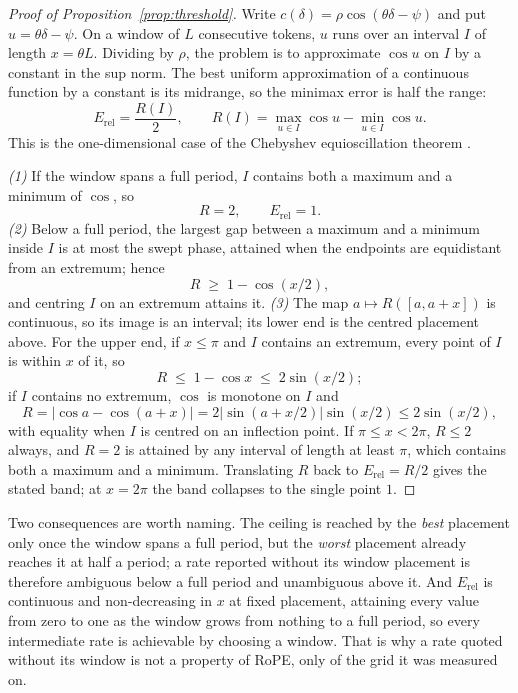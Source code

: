 \documentclass{article}
\theoremstyle{plain}
\theoremstyle{remark}
\begin{document}
\begin{proof}[Proof of Proposition~\ref{prop:threshold}]
Write $c(\delta)=\rho\cos(\theta\delta-\psi)$ and put $u=\theta\delta-\psi$. On
a window of $L$ consecutive tokens, $u$ runs over an interval $I$ of length
$x=\theta L$. Dividing by $\rho$, the problem is to approximate $\cos u$ on $I$
by a constant in the sup norm. The best uniform approximation of a continuous
function by a constant is its midrange, so the minimax error is half the range:
\begin{equation}
  E_{\mathrm{rel}} = \frac{R(I)}{2}, \qquad
  R(I) = \max_{u\in I}\cos u - \min_{u\in I}\cos u .
\end{equation}
This is the one-dimensional case of the Chebyshev equioscillation theorem
\citep{powell1981approximation}.

\emph{(1)} If the window spans a full period, $I$ contains both a maximum and a
minimum of $\cos$, so
\begin{equation}
  R = 2, \qquad E_{\mathrm{rel}} = 1 .
\end{equation}
\emph{(2)} Below a full period, the largest gap between a maximum and a minimum
inside $I$ is at most the swept phase, attained when the endpoints are
equidistant from an extremum; hence
\begin{equation}
  R \;\ge\; 1-\cos(x/2),
\end{equation}
and centring $I$ on an extremum attains it. \emph{(3)} The map
$a\mapsto R([a,a+x])$ is continuous, so its image is an interval; its lower end
is the centred placement above. For the upper end, if $x\le\pi$ and $I$ contains
an extremum, every point of $I$ is within $x$ of it, so
\begin{equation}
  R \;\le\; 1-\cos x \;\le\; 2\sin(x/2);
\end{equation}
if $I$ contains no extremum, $\cos$ is monotone on $I$ and
\begin{equation}
  R = |\cos a-\cos(a+x)| = 2|\sin(a+x/2)|\sin(x/2) \le 2\sin(x/2),
\end{equation}
with equality when $I$ is centred on an inflection point. If $\pi\le x<2\pi$,
$R\le2$ always, and $R=2$ is attained by any interval of length at least $\pi$,
which contains both a maximum and a minimum. Translating $R$ back to
$E_{\mathrm{rel}}=R/2$ gives the stated band; at $x=2\pi$ the band collapses to
the single point $1$.
\end{proof}

Two consequences are worth naming. The ceiling is reached by the \emph{best}
placement only once the window spans a full period, but the \emph{worst}
placement already reaches it at half a period; a rate reported without its window
placement is therefore ambiguous below a full period and unambiguous above it.
And $E_{\mathrm{rel}}$ is continuous and non-decreasing in $x$ at fixed
placement, attaining every value from zero to one as the window grows from
nothing to a full period, so every intermediate rate is achievable by choosing a
window. That is why a rate quoted without its window is not a property of RoPE,
only of the grid it was measured on.
\end{document}

